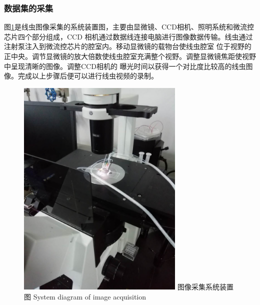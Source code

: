 \subsubsection{数据集的采集}
	图\ref{fig:chap5:camera}是线虫图像采集的系统装置图，主要由显微镜、CCD相机、照明系统和微流控芯片四个部分组成，CCD
	相机通过数据线连接电脑进行图像数据传输。线虫通过注射泵注入到微流控芯片的腔室内。移动显微镜的载物台使线虫腔室
	位于视野的正中央。调节显微镜的放大倍数使线虫腔室充满整个视野。调整显微镜焦距使视野中呈现清晰的图像。调整CCD相机的
	曝光时间以获得一个对比度比较高的线虫图像。完成以上步骤后便可以进行线虫视频的录制。
	\begin{figure}[thb]
	  \centering
	  \includegraphics[width=8cm]{figure/chap5/camera.jpg}
	  \bicaption
		{图像采集系统装置图}
		{System diagram of image acquisition}
	  \label{fig:chap5:camera}
	\end{figure}
